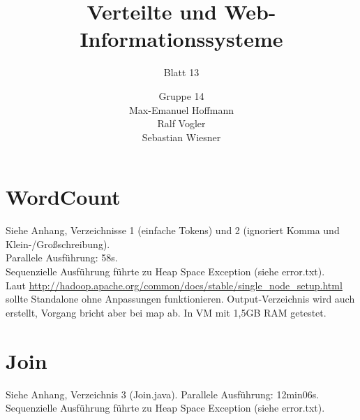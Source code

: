 \documentclass[11pt,a4paper]{scrartcl}
\begin{document}
\author{Gruppe 14\\Max-Emanuel Hoffmann\\Ralf Vogler\\Sebastian Wiesner}
\title{Verteilte und Web-Informationssysteme}
\subtitle{Blatt 13}

\maketitle

\section{WordCount}
Siehe Anhang, Verzeichnisse 1 (einfache Tokens) und 2 (ignoriert Komma und Klein-/Großschreibung).\\
Parallele Ausführung: 58s.\\
Sequenzielle Ausführung führte zu Heap Space Exception (siehe error.txt).\\
Laut \url{http://hadoop.apache.org/common/docs/stable/single_node_setup.html} sollte Standalone ohne Anpassungen funktionieren. Output-Verzeichnis wird auch erstellt, Vorgang bricht aber bei map ab. In VM mit 1,5GB RAM getestet.

\section{Join}
Siehe Anhang, Verzeichnis 3 (Join.java).
Parallele Ausführung: 12min06s.
Sequenzielle Ausführung führte zu Heap Space Exception (siehe error.txt).
\end{document}
